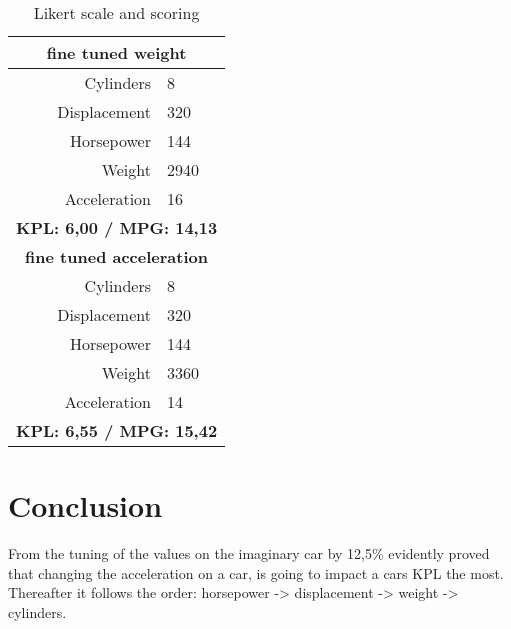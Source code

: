 \documentclass[a4paper, twocolumn]{article}
\begin{document}
\begin{table}[!ht]
\begin{tabular}{r | l}
        \hline\hline
        \multicolumn{2}{c}{\textbf{fine tuned weight}} \\
        \hline
        Cylinders & 8\\
        Displacement & 320 \\
        Horsepower & 144 \\
        Weight & 2940 \\
        Acceleration & 16 \\ [1ex]
        \hline
        \multicolumn{2}{c}{\textbf{KPL: 6,00 / MPG: 14,13 }} \\
        \hline\hline
        \multicolumn{2}{c}{\textbf{fine tuned acceleration}} \\
        \hline
        Cylinders & 8\\
        Displacement & 320 \\
        Horsepower & 144 \\
        Weight & 3360 \\
        Acceleration & 14 \\ [1ex]
        \hline
        \multicolumn{2}{c}{\textbf{KPL: 6,55 / MPG: 15,42 }} \\
    \end{tabular}
    \caption{Likert scale and scoring}
    \label{table:Likert scale and scoring}
\end{table}


\section{Conclusion\label{sec:Conclusion}}

From the tuning of the values on the imaginary car by 12,5\% evidently proved that changing the acceleration on a car, is going to impact a cars KPL the most. Thereafter it follows the order: horsepower -> displacement -> weight -> cylinders.


\printbibliography
\end{document}
